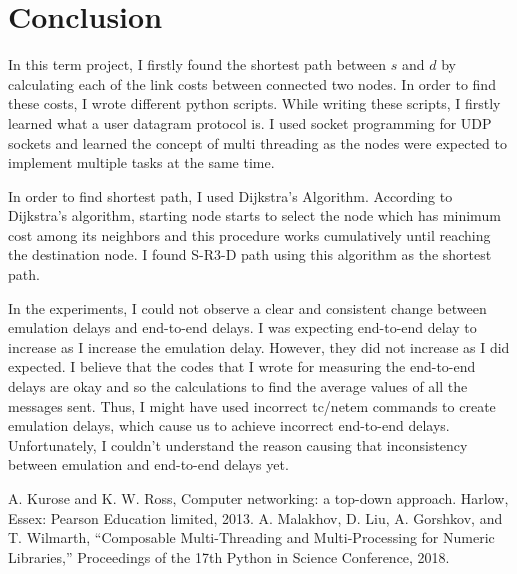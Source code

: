 \documentclass[conference]{IEEEtran}
\begin{document}
\section{Conclusion}
In this term project, I firstly found the shortest path between $s$ and $d$ by calculating each of the link costs between connected two nodes. In order to find these costs, I wrote different python scripts. While writing these scripts, I firstly learned what a user datagram protocol is. I used socket programming for UDP sockets and learned the concept of multi threading as the nodes were expected to implement multiple tasks at the same time.

In order to find shortest path, I used Dijkstra's Algorithm. According to Dijkstra's algorithm, starting node starts to select the node which has minimum cost among its neighbors and this procedure works cumulatively until reaching the destination node. I found S-R3-D path using this algorithm as the shortest path.

In the experiments, I could not observe a clear and consistent change between emulation delays and end-to-end delays. I was expecting end-to-end delay to increase as I increase the emulation delay. However, they did not increase as I did expected. I believe that the codes that I wrote for measuring the end-to-end delays are okay and so the calculations to find the average values of all the messages sent. Thus, I might have used incorrect tc/netem commands to create emulation delays, which cause us to achieve incorrect end-to-end delays. Unfortunately, I couldn't understand the reason causing that inconsistency between emulation and end-to-end delays yet.

\begin{thebibliography}{00}
A. Kurose and K. W. Ross, Computer networking: a top-down approach. Harlow, Essex: Pearson Education limited, 2013.
A. Malakhov, D. Liu, A. Gorshkov, and T. Wilmarth, “Composable Multi-Threading and Multi-Processing for Numeric Libraries,” Proceedings of the 17th Python in Science Conference, 2018.
\end{thebibliography}
\end{document}

